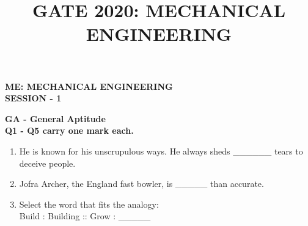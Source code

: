 \documentclass[12pt,onecolumn]{article}
\title{GATE 2020: MECHANICAL ENGINEERING}
\begin{document}
\begin{center}
    \LARGE\textbf{ME: MECHANICAL ENGINEERING}\\
    \Large\textbf{SESSION - 1}
\end{center}

\noindent\large\textbf{GA - General Aptitude}\\
\normalsize\textbf{Q1 - Q5 carry one mark each.}

\begin{enumerate}
    \item He is known for his unscrupulous ways. He always sheds \_\_\_\_\_\_ tears to deceive people.
          \begin{enumerate}
          \end{enumerate}

    \item Jofra Archer, the England fast bowler, is \_\_\_\_\_ than accurate.
          \begin{enumerate}
          \end{enumerate}

    \item Select the word that fits the analogy:\\Build : Building :: Grow : \_\_\_\_\_
          \begin{enumerate}
          \end{enumerate}


\end{enumerate}
\end{document}
